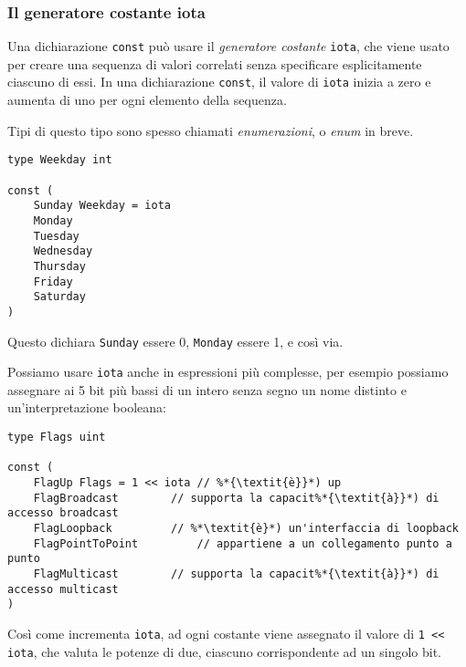 \documentclass[../../../thesis.tex]{subfiles}
\begin{document}
    \subsubsection{Il generatore costante iota}
    Una dichiarazione \verb"const" può usare il \textit{generatore costante} \verb"iota", che viene usato per creare una sequenza di valori correlati senza specificare esplicitamente ciascuno di essi.
    In una dichiarazione \verb"const", il valore di \verb"iota" inizia a zero e aumenta di uno per ogni elemento della sequenza.
    \hfill \vspace{12pt}

    Tipi di questo tipo sono spesso chiamati \textit{enumerazioni}, o \textit{enum} in breve.
    \begin{lstlisting}[frame = single,label={lst:lstlisting2-3-1.1}]
type Weekday int

const (
    Sunday Weekday = iota
    Monday
    Tuesday
    Wednesday
    Thursday
    Friday
    Saturday
)
    \end{lstlisting}
    Questo dichiara \verb"Sunday" essere 0, \verb"Monday" essere 1, e così via.
    \hfill \vspace{12pt}

    Possiamo usare \verb"iota" anche in espressioni più complesse, per esempio possiamo assegnare ai 5 bit più bassi di un intero senza segno un nome distinto e un'interpretazione booleana:
    \begin{lstlisting}[frame = single,label={lst:lstlisting2-3-1.2}]
type Flags uint

const (
    FlagUp Flags = 1 << iota // %*{\textit{è}}*) up
    FlagBroadcast	     // supporta la capacit%*{\textit{à}}*) di accesso broadcast
    FlagLoopback	     // %*\textit{è}*) un'interfaccia di loopback
    FlagPointToPoint	     // appartiene a un collegamento punto a punto
    FlagMulticast	     // supporta la capacit%*{\textit{à}}*) di accesso multicast
)
    \end{lstlisting}
    Così come incrementa \verb"iota", ad ogni costante viene assegnato il valore di \verb"1 << iota", che valuta le potenze di due, ciascuno corrispondente ad un singolo bit.
\end{document}
